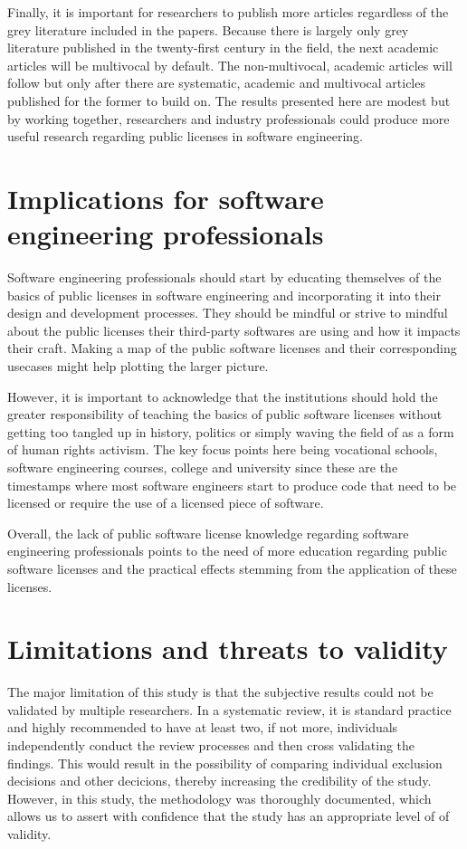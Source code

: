 Finally, it is important for researchers to publish more articles regardless of the grey literature included in the papers. Because there is largely only grey literature published in the twenty-first century in the field, the next academic articles will be multivocal by default. The non-multivocal, academic articles will follow but only after there are systematic, academic and multivocal articles published for the former to build on. The results presented here are modest but by working together, researchers and industry professionals could produce more useful research regarding public licenses in software engineering.

\section{Implications for software engineering professionals}
Software engineering professionals should start by educating themselves of the basics of public licenses in software engineering and incorporating it into their design and development processes. They should be mindful or strive to mindful about the public licenses their third-party softwares are using and how it impacts their craft. Making a map of the public software licenses and their corresponding usecases might help plotting the larger picture.

However, it is important to acknowledge that the institutions should hold the greater responsibility of teaching the basics of public software licenses without getting too tangled up in history, politics or simply waving the field of as a form of human rights activism. The key focus points here being vocational schools, software engineering courses, college and university since these are the timestamps where most software engineers start to produce code that need to be licensed or require the use of a licensed piece of software.

Overall, the lack of public software license knowledge regarding software engineering professionals points to the need of more education regarding public software licenses and the practical effects stemming from the application of these licenses.

\section{Limitations and threats to validity}
The major limitation of this study is that the subjective results could not be validated by multiple researchers. In a systematic review, it is standard practice and highly recommended to have at least two, if not more, individuals independently conduct the review processes and then cross validating the findings. This would result in the possibility of comparing individual exclusion decisions and other decicions, thereby increasing the credibility of the study. However, in this study, the methodology was thoroughly documented, which allows us to assert with confidence that the study has an appropriate level of of validity.

